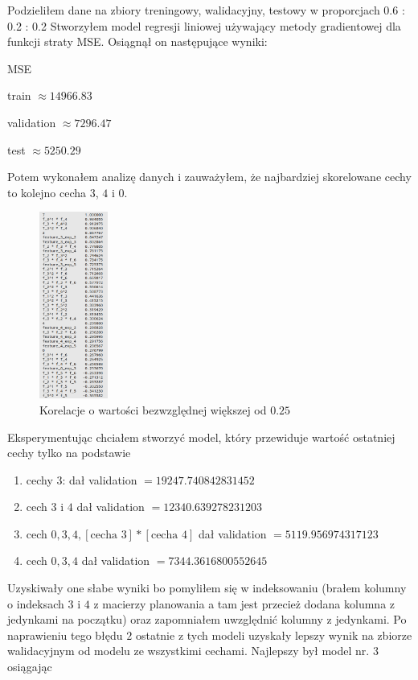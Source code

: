 \documentclass{article}
\begin{document}
  Podzieliłem dane na zbiory treningowy, walidacyjny, testowy w proporcjach 0.6 : 0.2 : 0.2
  Stworzyłem model regresji liniowej używający metody gradientowej dla funkcji straty MSE. Osiągnął on następujące wyniki:

  MSE

  train $\approx 14966.83$

  validation $\approx 7296.47$

  test $\approx 5250.29$

  Potem wykonałem analizę danych i zauważyłem, że najbardziej skorelowane cechy to kolejno cecha $3$, $4$ i $0$.

  \begin{figure}
    \centering
    \includegraphics[width=0.2\textwidth]{Correlations.png}
    \caption{Korelacje o wartości bezwzględnej większej od $0.25$}
  \end{figure}

  Eksperymentując chciałem stworzyć model, który przewiduje wartość ostatniej cechy tylko na podstawie 
  \begin{enumerate}
    \item cechy $3$: dał validation $= 19247.740842831452$
    \item cech $3$ i $4$ dał validation $= 12340.639278231203$ 
    \item cech $0, 3, 4, [\text{cecha } 3] * [\text{cecha } 4]$ dał validation $= 5119.956974317123$
    \item cech $0, 3, 4 $  dał validation $= 7344.3616800552645$
  \end{enumerate}
  Uzyskiwały one słabe wyniki bo pomyliłem się w indeksowaniu (brałem kolumny o indeksach $3$ i $4$ z macierzy planowania a tam jest przecież dodana kolumna z jedynkami na początku) 
  oraz zapomniałem uwzględnić kolumny z jedynkami.
  Po naprawieniu tego błędu $2$ ostatnie z tych modeli uzyskały lepszy wynik na zbiorze walidacyjnym od modelu ze wszystkimi cechami.
  Najlepszy był model nr. $3$ osiągając
\end{document}
